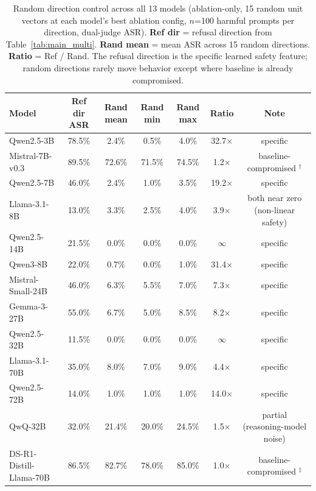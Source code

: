 \documentclass{article}
\begin{document}
\begin{table}[t]
\caption{Random direction control across all 13 models (ablation-only, 15 random unit vectors at each model's best ablation config, $n$=100 harmful prompts per direction, dual-judge ASR). \textbf{Ref dir} = refusal direction from Table~\ref{tab:main_multi}. \textbf{Rand mean} = mean ASR across 15 random directions. \textbf{Ratio} = Ref / Rand. The refusal direction is the specific learned safety feature; random directions rarely move behavior except where baseline is already compromised.}
\label{tab:random_control}
\begin{center}
\scriptsize
\begin{tabular}{l>{\columncolor{ctrlshade}}cccc>{\columncolor{gapshade}}cc}
\toprule
\textbf{Model} & \textbf{Ref dir ASR} & \textbf{Rand mean} & \textbf{Rand min} & \textbf{Rand max} & \textbf{Ratio} & \textbf{Note} \\
\midrule
Qwen2.5-3B      & 78.5\% & 2.4\%  & 0.5\% & 4.0\% & 32.7$\times$ & specific\\
Mistral-7B-v0.3 & 89.5\% & 72.6\% & 71.5\% & 74.5\% & 1.2$\times$ & baseline-compromised $^\dagger$ \\
Qwen2.5-7B      & 46.0\% & 2.4\%  & 1.0\% & 3.5\% & 19.2$\times$ & specific\\
Llama-3.1-8B    & 13.0\% & 3.3\%  & 2.5\% & 4.0\% & 3.9$\times$ & both near zero (non-linear safety)\\
Qwen2.5-14B     & 21.5\% & 0.0\%  & 0.0\% & 0.0\% & $\infty$    & specific\\
Qwen3-8B        & 22.0\% & 0.7\%  & 0.0\% & 1.0\% & 31.4$\times$ & specific\\
Mistral-Small-24B & 46.0\% & 6.3\% & 5.5\% & 7.0\% & 7.3$\times$ & specific\\
Gemma-3-27B     & 55.0\% & 6.7\%  & 5.0\% & 8.5\% & 8.2$\times$ & specific\\
Qwen2.5-32B     & 11.5\% & 0.0\%  & 0.0\% & 0.0\% & $\infty$    & specific\\
Llama-3.1-70B   & 35.0\% & 8.0\%  & 7.0\% & 9.0\% & 4.4$\times$ & specific\\
Qwen2.5-72B     & 14.0\% & 1.0\%  & 1.0\% & 1.0\% & 14.0$\times$ & specific\\
\rowcolor{reasoning} QwQ-32B         & 32.0\% & 21.4\% & 20.0\% & 24.5\% & 1.5$\times$ & partial (reasoning-model noise)\\
\rowcolor{reasoning} DS-R1-Distill-Llama-70B & 86.5\% & 82.7\% & 78.0\% & 85.0\% & 1.0$\times$ & baseline-compromised $^\ddagger$ \\
\bottomrule
\end{tabular}
\end{center}
\end{table}
\end{document}
